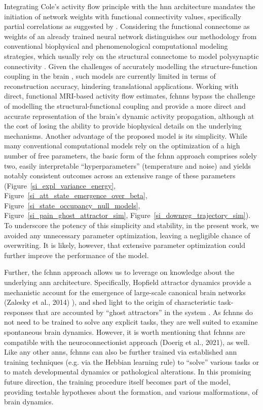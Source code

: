 \documentclass{article}
\begin{document}
Integrating Cole's activity flow principle with the \acrshort{hnn} architecture mandates the initiation of network weights with functional connectivity values, specifically partial correlations as suggested by \citet{cole2016activity}.
Considering the functional connectome as weights of an already trained neural network distinguishes our methodology from conventional biophysical and phenomenological computational modeling strategies, which usually rely on the structural connectome to model polysynaptic connectivity \citep{cabral2017functional, deco2012anatomy, golos2015multistability, hansen2015functional}. Given the challenges of accurately modelling the structure-function coupling in the brain \citep{seguin2023brain}, such models are currently limited in terms of reconstruction accuracy, hindering translational applications.
Working with direct, functional MRI-based activity flow estimates, \acrshort{fchnn}s bypass the challenge of modelling the structural-functional coupling and provide a more direct and accurate representation of the brain's dynamic activity propagation, although at the cost of losing the ability to provide biophysical details on the underlying mechanisms.
Another advantage of the proposed model is its simplicity. While many conventional computational models rely on the optimization of a high number of free parameters, the basic form of the \acrshort{fchnn} approach comprises solely two, easily interpretable  ``hyperparameters'' (temperature and noise) and yields notably consistent outcomes across an extensive range of these parameters (Figure~\ref{si_expl_variance_energy}, Figure~\ref{si_att_state_emergence_over_beta}, Figure~\ref{si_state_occupancy_null_models}, Figure~\ref{si_pain_ghost_attractor_sim}, Figure~\ref{si_downreg_trajectory_sim}). To underscore the potency of this simplicity and stability, in the present work, we avoided any unnecessary parameter optimization, leaving a negligible chance of overwriting. It is likely, however, that extensive parameter optimization could further improve the performance of the model.

Further, the \acrshort{fchnn} approach allows us to leverage on knowledge about the underlying \acrshort{ann} architecture. Specifically, Hopfield attractor dynamics provide a mechanistic account for the emergence of large-scale canonical brain networks (Zalesky et al., 2014) ), and shed light to the origin of characteristic task-responses that are accounted by ``ghost attractors'' in the system \citep{deco2012ongoing, vohryzek2020ghost}.
As \acrshort{fchnn}s do not need to be trained to solve any explicit tasks, they are well suited to examine spontaneous brain dynamics. However, it is worth mentioning that \acrshort{fchnn}s are compatible with the neuroconnectionist approach (Doerig et al., 2021), as well.
Like any other \acrshort{ann}s, \acrshort{fchnn}s can also be further trained via established \acrshort{ann} training techniques (e.g. via the Hebbian learning rule) to ``solve'' various tasks or to match developmental dynamics or pathological alterations. In this promising future direction, the training procedure itself becomes part of the model, providing testable hypotheses about the formation, and various malformations, of brain dynamics.
\end{document}
